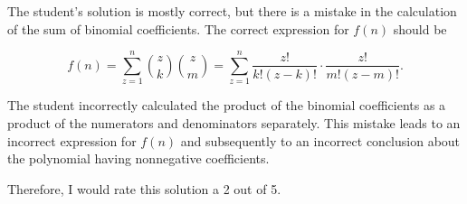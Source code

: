 The student's solution is mostly correct, but there is a mistake in the calculation of the sum of binomial coefficients. The correct expression for \( f(n) \) should be

\[
f(n) = \sum_{z=1}^{n} \binom{z}{k} \binom{z}{m} = \sum_{z=1}^{n} \frac{z!}{k!(z-k)!} \cdot \frac{z!}{m!(z-m)!}.
\]

The student incorrectly calculated the product of the binomial coefficients as a product of the numerators and denominators separately. This mistake leads to an incorrect expression for \( f(n) \) and subsequently to an incorrect conclusion about the polynomial having nonnegative coefficients. 

Therefore, I would rate this solution a 2 out of 5.
